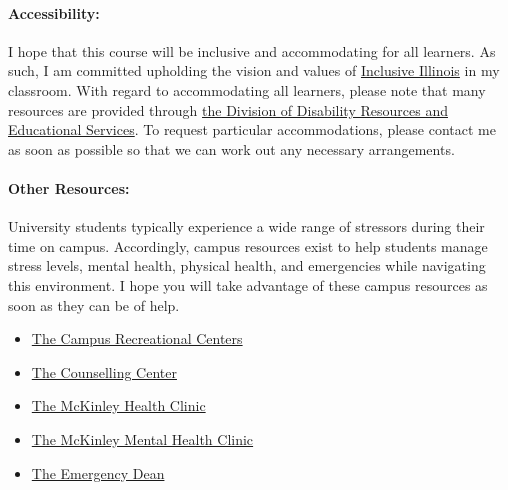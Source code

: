 \documentclass[11pt]{article}
\begin{document}
\paragraph{Accessibility:} I hope that this course will be inclusive and 
accommodating for all learners. As such, I am committed upholding the vision 
and values of \href{http://www.inclusiveillinois.illinois.edu/index.html}{Inclusive Illinois}
in my 
classroom.  With regard to accommodating all learners, please note that many 
resources are provided through 
\href{http://disability.illinois.edu/academic-support/accommodations}{the 
Division of Disability Resources and Educational Services}.  To request 
particular accommodations, please contact me as soon as possible so that we can 
work out any necessary arrangements.

\paragraph{Other Resources:} 
University students typically experience a wide range of stressors during their 
time on campus. Accordingly, campus resources exist to help students manage  
stress levels, mental health, physical health, and emergencies while navigating 
this environment. I hope you will take advantage of these campus resources as 
soon as they can be of help.

\begin{itemize}
\item \href{https://campusrec.illinois.edu/}{The Campus Recreational Centers}
\item \href{http://counselingcenter.illinois.edu/}{The Counselling Center}
\item \href{https://mckinley.illinois.edu/}{The McKinley Health Clinic}
\item \href{http://www.mckinley.illinois.edu/medical-services/mental-health}{The McKinley Mental Health Clinic}
\item \href{https://odos.illinois.edu/community-of-care/emergency-dean/}{The Emergency Dean}
\end{itemize}
\end{document}
